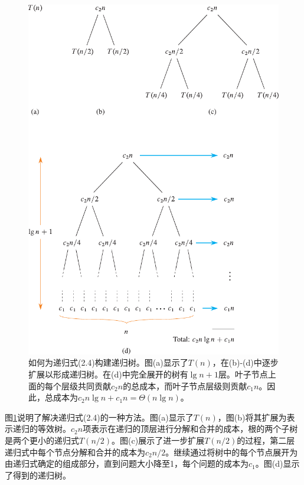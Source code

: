 \documentclass[lang=cn,newtx,10pt,scheme=chinese]{elegantbook}
\begin{document}
\begin{figure}[htbp]
    \centering
    \includegraphics{算法导论第四版插图/第二章/归并排序的递归树示意图.pdf}
    \caption{如何为递归式(2.4)构建递归树。图(a)显示了$T(n)$，在(b)-(d)中逐步扩展以形成递归树。在(d)中完全展开的树有$\lg n + 1$层。叶子节点上面的每个层级共同贡献$c_2n$的总成本，而叶子节点层级则贡献$c_1n$。因此，总成本为$c_2 n \lg n+c_1 n=\Theta(n \lg n)$。}
    \label{fig:归并排序的递归树示意图}
\end{figure}

图\ref{fig:归并排序的递归树示意图}说明了解决递归式(2.4)的一种方法。图(a)显示了$T(n)$，图(b)将其扩展为表示递归的等效树。$c_2n$项表示在递归的顶层进行分解和合并的成本，根的两个子树是两个更小的递归式$T(n/2)$。图(c)展示了进一步扩展$T(n/2)$的过程，第二层递归式中每个节点分解和合并的成本为$c_2 n/2$。继续通过将树中的每个节点展开为由递归式确定的组成部分，直到问题大小降至1，每个问题的成本为$c_1$。图(d)显示了得到的递归树。
\end{document}
